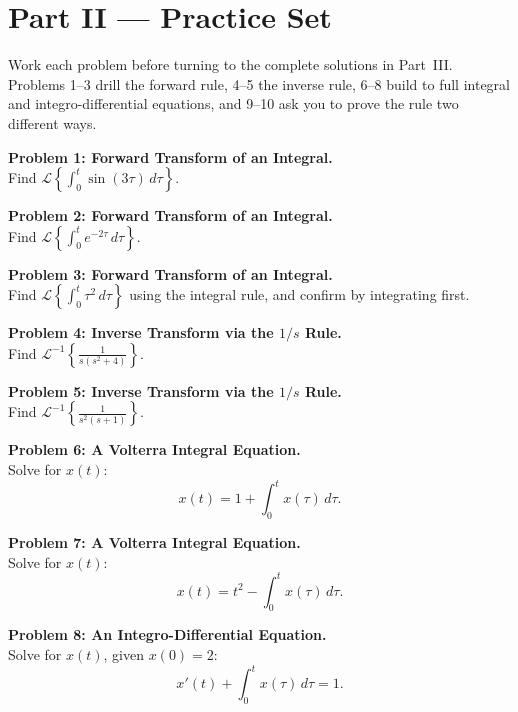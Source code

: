 \documentclass[11pt]{article}
\begin{document}
\clearpage
{}
{}
\section*{Part II --- Practice Set}

Work each problem before turning to the complete solutions in Part~III. Problems 1--3 drill the forward rule, 4--5 the inverse rule, 6--8 build to full integral and integro-differential equations, and 9--10 ask you to prove the rule two different ways.

\bigskip
\noindent\textbf{Problem 1: Forward Transform of an Integral.}\\[2pt]
Find $\displaystyle \mathcal{L}\!\left\{\int_0^t \sin(3\tau)\,d\tau\right\}$.

\bigskip
\noindent\textbf{Problem 2: Forward Transform of an Integral.}\\[2pt]
Find $\displaystyle \mathcal{L}\!\left\{\int_0^t e^{-2\tau}\,d\tau\right\}$.

\bigskip
\noindent\textbf{Problem 3: Forward Transform of an Integral.}\\[2pt]
Find $\displaystyle \mathcal{L}\!\left\{\int_0^t \tau^{2}\,d\tau\right\}$ using the integral rule, and confirm by integrating first.

\bigskip
\noindent\textbf{Problem 4: Inverse Transform via the $1/s$ Rule.}\\[2pt]
Find $\displaystyle \mathcal{L}^{-1}\!\left\{\frac{1}{s(s^2+4)}\right\}$.

\bigskip
\noindent\textbf{Problem 5: Inverse Transform via the $1/s$ Rule.}\\[2pt]
Find $\displaystyle \mathcal{L}^{-1}\!\left\{\frac{1}{s^2(s+1)}\right\}$.

\bigskip
\noindent\textbf{Problem 6: A Volterra Integral Equation.}\\[2pt]
Solve for $x(t)$:
\[ x(t) = 1 + \int_0^t x(\tau)\,d\tau. \]

\bigskip
\noindent\textbf{Problem 7: A Volterra Integral Equation.}\\[2pt]
Solve for $x(t)$:
\[ x(t) = t^{2} - \int_0^t x(\tau)\,d\tau. \]

\bigskip
\noindent\textbf{Problem 8: An Integro-Differential Equation.}\\[2pt]
Solve for $x(t)$, given $x(0) = 2$:
\[ x'(t) + \int_0^t x(\tau)\,d\tau = 1. \]
\end{document}
